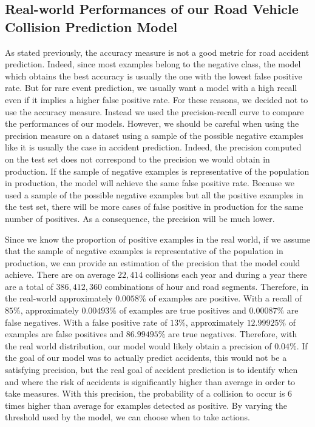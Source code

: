 \documentclass[conference]{IEEEtran}
\begin{document}
\subsection{Real-world Performances of our Road Vehicle Collision Prediction Model}
As stated previously, the accuracy measure is not a good metric for road accident
prediction. Indeed, since most examples belong to the negative class, the model which obtains
the best accuracy is usually the one with the lowest false positive rate. But for rare event
prediction, we usually want a model with a high recall even if it implies a higher false
positive rate. For these reasons, we decided not to use the accuracy measure. Instead
we used the precision-recall curve to compare the performances of our models. However, we
should be careful when using the precision measure on a dataset using a sample of the possible
negative examples like it is usually the case in accident prediction. Indeed, the precision
computed on the test set does not correspond to the precision we would obtain in production.
If the sample of negative examples is representative of the population
in production, the model will achieve the same false positive rate.
Because we used a sample of the possible negative examples but all the 
positive examples in the test set, there will be more cases of false positive in production for the same number of positives. As a consequence, the precision will be much lower.

Since we know the proportion of positive examples in the real world, if we assume that the
sample of negative examples is representative of the population in production, we can provide
an estimation of the precision that the model could achieve. There are on average $22,414$ collisions each year and during a year there are a total of $386,412,360$ combinations of hour and road segments. Therefore, in the real-world approximately $0.0058\%$ of examples are positive. With a recall of $85\%$, approximately $0.00493\%$ of examples are true positives and $0.00087\%$ are false negatives. With a false positive rate of $13\%$, approximately $12.99925\%$ of examples are false positives and $86.99495\%$ are true negatives. Therefore, with the real world distribution, our model would likely obtain a precision of
$0.04\%$. If the goal of our model was to actually predict accidents, this would not be a satisfying precision, but the real goal of accident prediction is to identify when and where the risk of accidents is significantly higher than average in order to take measures. With this precision, the probability of a collision to occur is 6 times higher than average for examples detected as positive. By varying the threshold used by the model, we can choose when to take actions.
\end{document}
